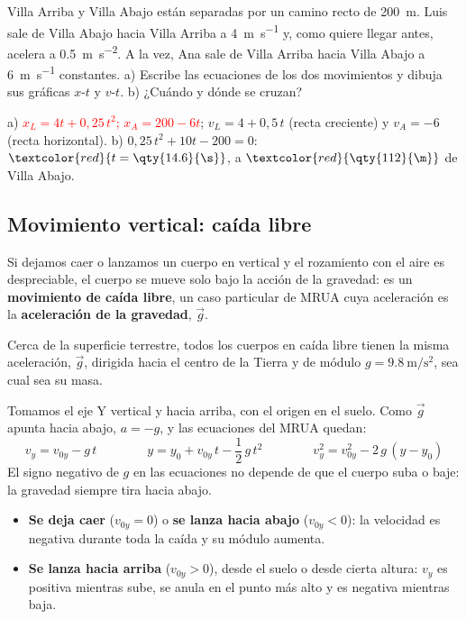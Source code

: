 \begin{exercise}
    Villa Arriba y Villa Abajo están separadas por un camino recto de \qty{200}{\m}. Luis sale de Villa Abajo hacia Villa Arriba
    a \qty{4}{\m\per\s} y, como quiere llegar antes, acelera a \qty{0.5}{\m\per\s\squared}. A la vez, Ana sale de Villa Arriba
    hacia Villa Abajo a \qty{6}{\m\per\s} constantes. a) Escribe las ecuaciones de los dos movimientos y dibuja sus gráficas
    \(x\)-\(t\) y \(v\)-\(t\). b) ¿Cuándo y dónde se cruzan?
    \begin{solu}
        a) \textcolor{red}{\(x_L = 4t + 0{,}25\,t^2\); \(x_A = 200 - 6t\)}; \(v_L = 4 + 0{,}5\,t\) (recta creciente) y \(v_A = -6\)
        (recta horizontal). b) \(0{,}25\,t^2 + 10t - 200 = 0\): \(\textcolor{red}{t = \qty{14.6}{\s}}\), a
        \(\textcolor{red}{\qty{112}{\m}}\) de Villa Abajo.
    \end{solu}
\end{exercise}

\subsection{Movimiento vertical: caída libre}

Si dejamos caer o lanzamos un cuerpo en vertical y el rozamiento con el aire es despreciable, el cuerpo se mueve solo bajo la acción
de la gravedad: es un \textbf{movimiento de caída libre}, un caso particular de MRUA cuya aceleración es la \textbf{aceleración de la
gravedad}, \(\vec g\).

\begin{definition}
    Cerca de la superficie terrestre, todos los cuerpos en caída libre tienen la misma aceleración, \(\vec g\), dirigida hacia el
    centro de la Tierra y de módulo \(g = \qty{9.8}{\m\per\s\squared}\), sea cual sea su masa.
\end{definition}

Tomamos el eje Y vertical y hacia arriba, con el origen en el suelo. Como \(\vec g\) apunta hacia abajo, \(a = -g\), y las ecuaciones
del MRUA quedan:
\[ \boxed{v_y = v_{0y} - g\,t} \qquad\qquad \boxed{y = y_0 + v_{0y}\,t - \frac{1}{2}\,g\,t^2} \qquad\qquad v_y^2 = v_{0y}^2 - 2\,g\,(y - y_0) \]
El signo negativo de \(g\) en las ecuaciones no depende de que el cuerpo suba o baje: la gravedad siempre tira hacia abajo.

\begin{itemize}
    \item \textbf{Se deja caer} (\(v_{0y} = 0\)) o \textbf{se lanza hacia abajo} (\(v_{0y} < 0\)): la velocidad es negativa durante
    toda la caída y su módulo aumenta.
    \item \textbf{Se lanza hacia arriba} (\(v_{0y} > 0\)), desde el suelo o desde cierta altura: \(v_y\) es positiva mientras sube,
    se anula en el punto más alto y es negativa mientras baja.
\end{itemize}

